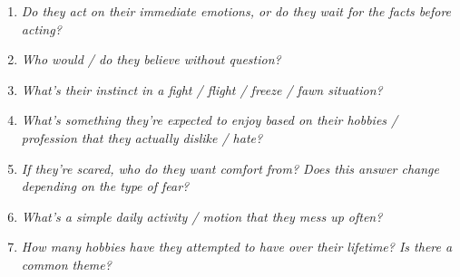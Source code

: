 \begin{enumerate}
    \item\textit{Do they act on their immediate emotions, or do they wait for the facts before acting?}
    \item\textit{Who would / do they believe without question?}
    \item\textit{What’s their instinct in a fight / flight / freeze / fawn situation?} 
    \item\textit{What’s something they’re expected to enjoy based on their hobbies / profession that they actually dislike / hate?}
    \item\textit{If they’re scared, who do they want comfort from? Does this answer change depending on the type of fear?}
    \item\textit{What’s a simple daily activity / motion that they mess up often?}
    \item\textit{How many hobbies have they attempted to have over their lifetime? Is there a common theme?}
  \end{enumerate}